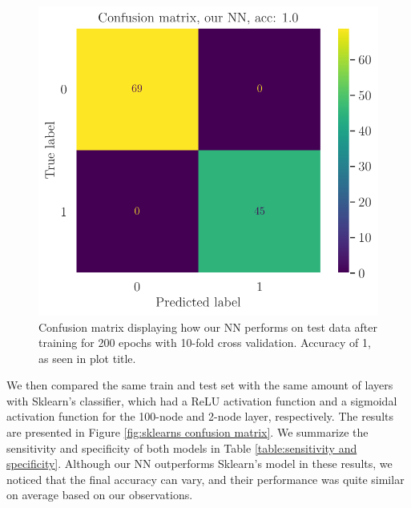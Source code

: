 \begin{figure}
    \centering
    \includegraphics[width=0.99\linewidth]{figures/ourWBC_final_ADAM_relu6-100_sigmoid-2.pdf}
    \caption{Confusion matrix displaying how our NN performs on test data after training for 200 epochs with 10-fold cross validation. Accuracy of 1, as seen in plot title.}
    \label{fig:our confusion matrix}
\end{figure}

We then compared the same train and test set with the same amount of layers with Sklearn's classifier, which had a ReLU activation function and a sigmoidal activation function for the 100-node and 2-node layer, respectively. The results are presented in Figure \ref{fig:sklearns confusion matrix}. We summarize the sensitivity and specificity of both models in Table \ref{table:sensitivity and specificity}. Although our NN outperforms Sklearn's model in these results, we noticed that the final accuracy can vary, and their performance was quite similar on average based on our observations. 

